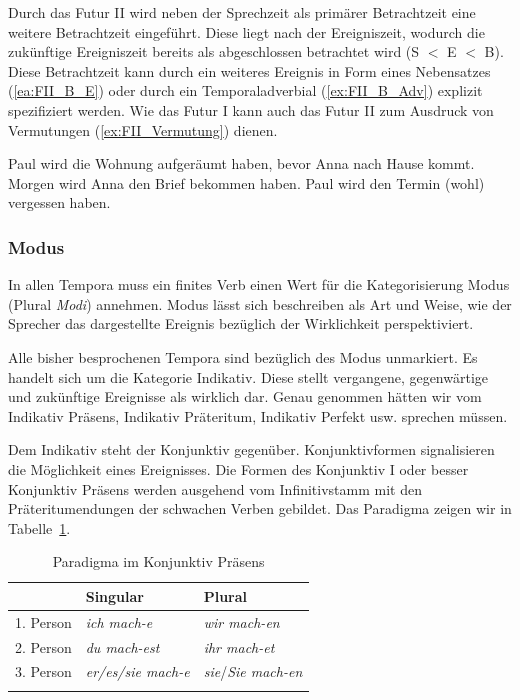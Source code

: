 Durch das Futur II wird neben der Sprechzeit als primärer Betrachtzeit eine weitere Betrachtzeit eingeführt. Diese liegt nach der Ereigniszeit, wodurch die zukünftige Ereigniszeit bereits als abgeschlossen betrachtet wird (S $<$ E $<$ B). Diese Betrachtzeit kann durch ein weiteres Ereignis in Form eines Nebensatzes (\ref{ea:FII_B_E}) oder durch ein Temporaladverbial (\ref{ex:FII_B_Adv}) explizit spezifiziert werden. Wie das Futur I kann auch das Futur II zum Ausdruck von Vermutungen (\ref{ex:FII_Vermutung}) dienen.

\ea \label{ea:FII}
\ea \label{ea:FII_B_E} Paul wird die Wohnung aufgeräumt haben, bevor Anna nach Hause kommt.
\ex \label{ex:FII_B_Adv} Morgen wird Anna den Brief bekommen haben.
\ex \label{ex:FII_Vermutung} Paul wird den Termin (wohl) vergessen haben.
\z 
\z 


\subsubsection{Modus}\label{subsubsection:Modus}

In allen Tempora muss ein finites Verb einen Wert für die Kategorisierung Modus (Plural \textit{Modi}) annehmen. Modus lässt sich beschreiben als Art und Weise, wie der Sprecher das dargestellte Ereignis bezüglich der Wirklichkeit perspektiviert. 


\label{subsubsubsection:Indikativ}

Alle bisher besprochenen Tempora sind bezüglich des Modus unmarkiert. Es handelt sich um die Kategorie Indikativ. Diese stellt vergangene, gegenwärtige und zukünftige Ereignisse als wirklich dar. Genau genommen hätten wir vom Indikativ Präsens, Indikativ Präteritum, Indikativ Perfekt usw. sprechen müssen. 

\label{subsubsubsection:KonjI}

Dem Indikativ steht der Konjunktiv gegenüber. Konjunktivformen signalisieren die Möglichkeit eines Ereignisses. Die Formen des Konjunktiv I oder besser Konjunktiv Präsens werden ausgehend vom Infinitivstamm mit den Präteritumendungen der schwachen Verben gebildet. Das Paradigma zeigen wir in Tabelle~\ref{tab:KonjI}.

\begin{table}
  \centering
  \begin{tabular}{l l l}
    \lsptoprule
    & Singular & Plural \\
    \hline
    1. Person & \textit{ich mach-e}  & \textit{wir mach-en} \\
    
    2. Person & \textit{du mach-est}  & \textit{ihr mach-et} \\
    
    3. Person & \textit{er/es/sie mach-e} & \textit{sie}/\textit{Sie mach-en} \\
    \lspbottomrule 
  \end{tabular}
  \caption{Paradigma im Konjunktiv Präsens}
  \label{tab:KonjI}
\end{table}


